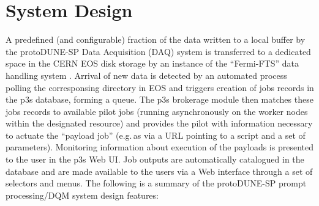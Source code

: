 \documentclass{webofc}
\newcommand{\pd}{protoDUNE\xspace}
\begin{document}
\section{System Design}
\label{sec:outline}

A predefined (and configurable) fraction of the data written to a local buffer
by the  \pd-SP Data Acquisition (DAQ) system is  transferred to a dedicated space
in the  CERN EOS disk storage  \cite{castoreos,eos_role} by an instance of the ``Fermi-FTS''
data handling system \cite{fts}. Arrival of new data is detected by an automated process
polling the corresponsing directory in EOS and triggers creation of jobs records in the
p3s database, forming a queue. The p3s brokerage module then matches these jobs records
to available pilot jobs (running asynchronously on the worker nodes within the designated
resource) and provides the pilot with information necessary to actuate the ``payload job'' (e.g.\,as via a URL
pointing to a script and a set of parameters). Monitoring information about execution
of the payloads is presented to the user in the p3s Web UI.
Job outputs are automatically catalogued in the database and are made available
to the users via a Web interface through a set of selectors and menus.
The following is a summary  of the \pd-SP
prompt processing/DQM system design features\cite{chep18}:
\end{document}
